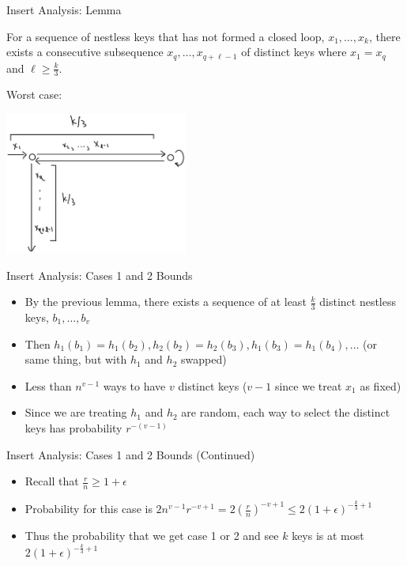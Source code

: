 \documentclass[aspectratio=169]{beamer}
\begin{document}
\begin{frame}{Insert Analysis: Lemma}
    \begin{lem}
        For a sequence of nestless keys that has not formed a closed loop, $x_1, \ldots, x_k$, there exists a consecutive subsequence $x_q, \ldots, x_{q + \ell - 1}$ of distinct keys where $x_1 = x_q$ and $\ell \ge \frac k 3$.
    \end{lem} \pause
    \begin{pf_pic}
        Worst case:
        \begin{center}
            \includegraphics[width=0.45\textwidth]{images/proof.png}
        \end{center}
    \end{pf_pic}
\end{frame}

\begin{frame}{Insert Analysis: Cases 1 and 2 Bounds}
    \begin{itemize}
        \item By the previous lemma, there exists a sequence of at least $\frac k 3$ distinct nestless keys, $b_1, \ldots, b_v$
        \item Then $h_1(b_1) = h_1(b_2), h_2(b_2) = h_2(b_3), h_1(b_3) = h_1(b_4), \ldots$ (or same thing, but with $h_1$ and $h_2$ swapped) \pause
        \item Less than $n^{v - 1}$ ways to have $v$ distinct keys ($v - 1$ since we treat $x_1$ as fixed)
        \item Since we are treating $h_1$ and $h_2$ are random, each way to select the distinct keys has probability $r^{-(v - 1)}$
    \end{itemize}
\end{frame}

\begin{frame}{Insert Analysis: Cases 1 and 2 Bounds (Continued)}
    \begin{itemize}
        \item Recall that $\frac r n \ge 1 + \epsilon$
        \item Probability for this case is $2 n^{v - 1} r^{-v + 1} = 2 (\frac r n)^{-v + 1} \le 2 (1 + \epsilon)^{-\frac k 3 + 1}$
        \item Thus the probability that we get case 1 or 2 and see $k$ keys is at most $2 (1 + \epsilon)^{-\frac k 3 + 1}$
    \end{itemize}
\end{frame}
\end{document}

